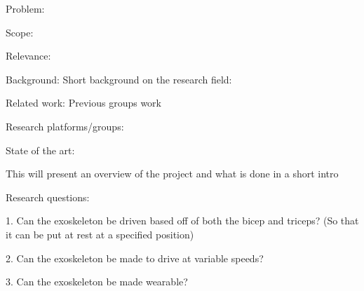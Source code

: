             Problem:
                

            Scope:
            
            Relevance: %


Background: 
    Short background on the research field:

    Related work:
        Previous groups work

    Research platforms/groups:

    State of the art:


    This will present an overview of the project and what is done in a short intro


Research questions:

1.	Can the exoskeleton be driven based off of both the bicep and triceps? (So that it can be put at rest at a specified position)

2.	Can the exoskeleton be made to drive at variable speeds?

3.	Can the exoskeleton be made wearable?

